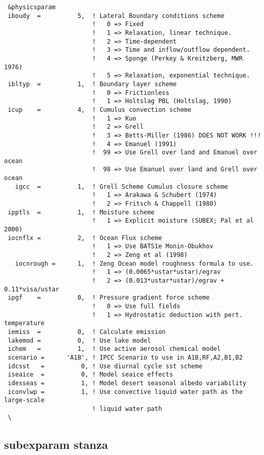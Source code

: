 {\footnotesize
\begin{Verbatim}
 &physicsparam
 iboudy  =          5,  ! Lateral Boundary conditions scheme
                        !   0 => Fixed
                        !   1 => Relaxation, linear technique.
                        !   2 => Time-dependent
                        !   3 => Time and inflow/outflow dependent.
                        !   4 => Sponge (Perkey & Kreitzberg, MWR 1976)
                        !   5 => Relaxation, exponential technique.
 ibltyp  =          1,  ! Boundary layer scheme
                        !   0 => Frictionless
                        !   1 => Holtslag PBL (Holtslag, 1990)
 icup    =          4,  ! Cumulus convection scheme
                        !   1 => Kuo
                        !   2 => Grell
                        !   3 => Betts-Miller (1986) DOES NOT WORK !!!
                        !   4 => Emanuel (1991)
                        !  99 => Use Grell over land and Emanuel over ocean
                        !  98 => Use Emanuel over land and Grell over ocean
   igcc  =          1,  ! Grell Scheme Cumulus closure scheme
                        !   1 => Arakawa & Schubert (1974)
                        !   2 => Fritsch & Chappell (1980)
 ipptls  =          1,  ! Moisture scheme
                        !   1 => Explicit moisture (SUBEX; Pal et al 2000)
 iocnflx =          2,  ! Ocean Flux scheme
                        !   1 => Use BATS1e Monin-Obukhov
                        !   2 => Zeng et al (1998)
   iocnrough =      1,  ! Zeng Ocean model roughness formula to use.
                        !   1 => (0.0065*ustar*ustar)/egrav
                        !   2 => (0.013*ustar*ustar)/egrav + 0.11*visa/ustar
 ipgf    =          0,  ! Pressure gradient force scheme
                        !   0 => Use full fields
                        !   1 => Hydrostatic deduction with pert. temperature
 iemiss  =          0,  ! Calculate emission
 lakemod =          0,  ! Use lake model
 ichem   =          1,  ! Use active aerosol chemical model
 scenario =      'A1B', ! IPCC Scenario to use in A1B,RF,A2,B1,B2
 idcsst   =          0, ! Use diurnal cycle sst scheme
 iseaice  =          0, ! Model seaice effects
 idesseas =          1, ! Model desert seasonal albedo variability
 iconvlwp =          1, ! Use convective liquid water path as the large-scale
                        ! liquid water path
 \
\end{Verbatim}
}

\subsection{subexparam stanza}

